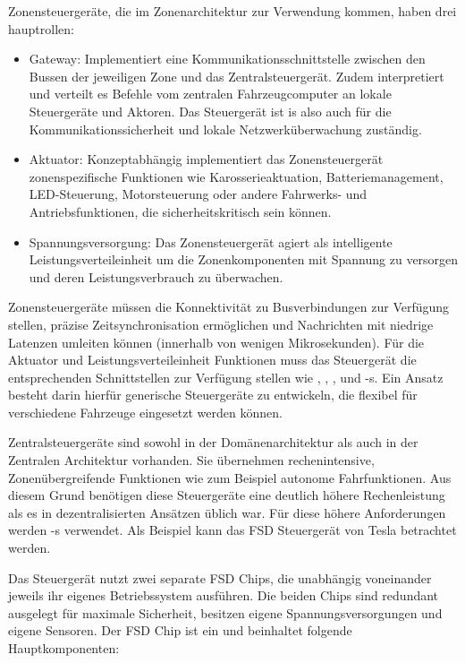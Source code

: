 Zonensteuergeräte, die im Zonenarchitektur zur Verwendung kommen, haben drei hauptrollen:
	\begin{itemize}
		\item Gateway: Implementiert eine Kommunikationsschnittstelle zwischen den Bussen der jeweiligen Zone und das Zentralsteuergerät.  Zudem interpretiert und verteilt es Befehle vom zentralen Fahrzeugcomputer an lokale Steuergeräte und Aktoren. Das Steuergerät ist is also auch für die Kommunikationssicherheit und lokale Netzwerküberwachung zuständig. 
		\item Aktuator: Konzeptabhängig implementiert das Zonensteuergerät zonenspezifische Funktionen wie Karosserieaktuation, Batteriemanagement, LED-Steuerung, Motorsteuerung oder andere Fahrwerks- und Antriebsfunktionen, die sicherheitskritisch sein können. 
		\item Spannungsversorgung: Das Zonensteuergerät agiert als intelligente Leistungsverteileinheit um die Zonenkomponenten mit Spannung zu versorgen und deren Leistungsverbrauch zu überwachen. 
	\end{itemize} \cite{Heurtefeux2021}

Zonensteuergeräte müssen die Konnektivität zu Busverbindungen zur Verfügung stellen, präzise Zeitsynchronisation ermöglichen und Nachrichten mit niedrige Latenzen umleiten können (innerhalb von wenigen Mikrosekunden). Für die Aktuator und Leistungsverteileinheit Funktionen muss das Steuergerät die entsprechenden Schnittstellen zur Verfügung stellen wie , , ,  und -s. Ein Ansatz besteht darin hierfür generische Steuergeräte zu entwickeln, die flexibel für verschiedene Fahrzeuge eingesetzt werden können.\cite{Maier2023}

Zentralsteuergeräte sind sowohl in der Domänenarchitektur als auch in der Zentralen Architektur vorhanden. Sie übernehmen rechenintensive, Zonenübergreifende Funktionen wie zum Beispiel autonome Fahrfunktionen. Aus diesem Grund benötigen diese Steuergeräte eine deutlich höhere Rechenleistung als es in dezentralisierten Ansätzen üblich war. Für diese höhere Anforderungen werden -s verwendet. Als Beispiel kann das FSD Steuergerät von Tesla betrachtet werden. 

Das Steuergerät nutzt zwei separate FSD Chips, die unabhängig voneinander jeweils ihr eigenes Betriebssystem ausführen. Die beiden Chips sind redundant ausgelegt für maximale Sicherheit, besitzen eigene Spannungsversorgungen und eigene Sensoren. Der FSD Chip ist ein  und beinhaltet folgende Hauptkomponenten:

